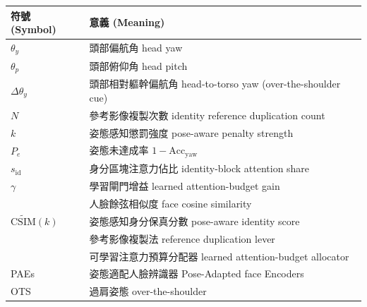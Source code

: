 \begin{center}
\begin{tabular}{ll}
\toprule
符號 (Symbol) & 意義 (Meaning) \\
\midrule
$\theta_y$ & 頭部偏航角 head yaw \\
$\theta_p$ & 頭部俯仰角 head pitch \\
$\Delta\theta_y$ & 頭部相對軀幹偏航角 head-to-torso yaw (over-the-shoulder cue) \\
$N$ & 參考影像複製次數 identity reference duplication count \\
$k$ & 姿態感知懲罰強度 pose-aware penalty strength \\
$P_e$ & 姿態未達成率 $1-\mathrm{Acc}_{\mathrm{yaw}}$ \\
$s_{\mathrm{id}}$ & 身分區塊注意力佔比 identity-block attention share \\
$\gamma$ & 學習閘門增益 learned attention-budget gain \\
\csim{} & 人臉餘弦相似度 face cosine similarity \\
$\widetilde{\mathrm{CSIM}}(k)$ & 姿態感知身分保真分數 pose-aware identity score \\
\dupid{} & 參考影像複製法 reference duplication lever \\
\gate{} & 可學習注意力預算分配器 learned attention-budget allocator \\
PAEs & 姿態適配人臉辨識器 Pose-Adapted face Encoders \\
OTS & 過肩姿態 over-the-shoulder \\
\bottomrule
\end{tabular}
\end{center}
